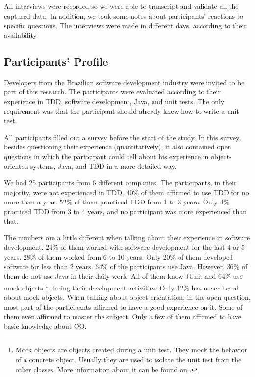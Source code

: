 \documentclass[times]{speauth}
\begin{document}
All interviews were recorded so we were able to transcript and validate all
the captured data. In addition, we took some notes about participants' reactions
to specific questions. The interviews were made in different days,
according to their availability.

\subsection{Participants' Profile}
\label{sec:planejamento-participantes}

Developers from the Brazilian software development industry were invited to be part
of this research. The participants were evaluated according to their experience in TDD,
software development, Java, and unit tests. The only requirement was that the participant
should already knew how to write a unit test.

All participants filled out a survey before the start of the study. In this survey,
besides questioning their experience (quantitatively), it also contained open questions in which
the participant could tell about his experience in object-oriented systems, Java, and
TDD in a more detailed way.

We had 25 participants from 6 different companies. The participants, in their majority,
were not experienced in TDD. 40\% of them affirmed to use TDD for no more than a year.
52\% of them practiced TDD from 1 to 3 years. Only 4\% practiced TDD from 3 to 4
years, and no participant was more experienced than that.

The numbers are a little different when talking about their experience in software
development. 24\% of them worked with software development for the last 4 or 5 years.
28\% of them worked from 6 to 10 years. Only 20\% of them developed software for less
than 2 years. 64\% of the participants use Java. However, 36\% of them do not use
Java in their daily work. All of them know JUnit and 64\% use mock objects 
\footnote{Mock objects are objects created during a unit test. They mock the behavior 
of a concrete object. Usually they are used to isolate the unit test from the other classes. 
More information about it can be found on \cite{mocks}.}
during their development activities.
Only 12\% has never heard about mock objects. When talking about object-orientation,
in the open question, most part of the participants affirmed to have a good experience
on it. Some of them even affirmed to master the subject. Only a few of them affirmed
to have basic knowledge about OO.
\end{document}
